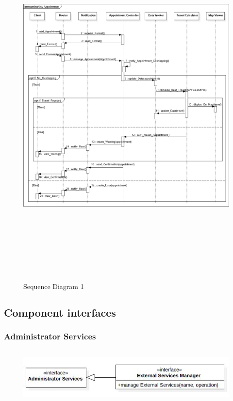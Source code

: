 \documentclass [12pt]{article}
\begin{document}
\begin{figure}[ht!]
\centering
\includegraphics[height=19cm, width=\linewidth]{SQ1.jpg}
\caption{Sequence Diagram 1}
\end{figure}  
\clearpage

\subsection{Component interfaces}

\subsubsection{Administrator Services}
\begin{figure}[ht!]
\centering
\includegraphics[height=3cm, width=12.5cm]{Int1.jpg}
\end{figure}
\end{document}
